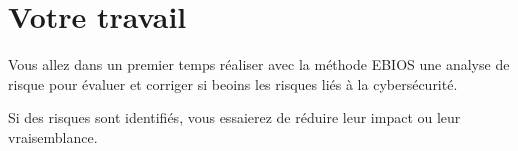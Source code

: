 \documentclass[french, 12pt]{article}%
\newif\ifPROF
\begin{document}
\section{Votre travail}

Vous allez dans un premier temps réaliser avec la méthode EBIOS une analyse de risque pour évaluer et corriger si beoins les risques liés à la cybersécurité. 

Si des risques sont identifiés, vous essaierez de réduire leur impact ou leur vraisemblance. 


\ifPROF
\begin{center}
\texttt{[image: ./ressource/présentationAcitivte.png]}
\end{center}
\fi	
\end{document}
